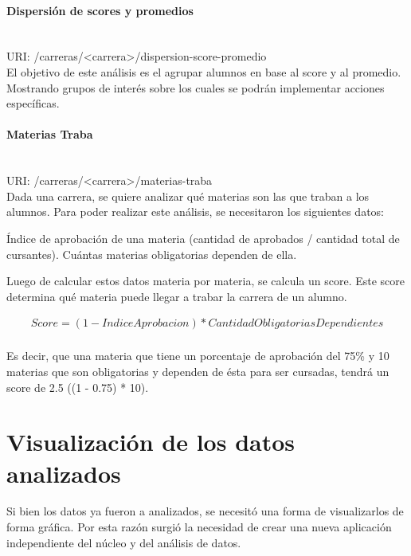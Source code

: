 \paragraph{Dispersión de scores y promedios}\mbox{}\\
URI: /carreras/<carrera>/dispersion-score-promedio \\

El objetivo de este análisis es el agrupar alumnos en base al score y al promedio. Mostrando grupos de interés sobre los cuales se podrán implementar acciones específicas.

\paragraph{Materias Traba}\mbox{}\\

URI: /carreras/<carrera>/materias-traba \\

Dada una carrera, se quiere analizar qué materias son las que traban a los alumnos. 
Para poder realizar este análisis, se necesitaron los siguientes datos:
\begin{outline}
\1 Índice de aprobación de una materia (cantidad de aprobados / cantidad total de cursantes).
\1 Cuántas materias obligatorias dependen de ella.
\end{outline}

Luego de calcular estos datos materia por materia, se calcula un score. Este score determina qué materia puede llegar a trabar la carrera de un alumno.

\begin{align*}
  Score = (1 - IndiceAprobacion) * CantidadObligatoriasDependientes\\
\end{align*}

Es decir, que una materia que tiene un porcentaje de aprobación del 75\% y 10 materias que son obligatorias y dependen de ésta para ser cursadas, tendrá un score de 2.5 ((1 - 0.75) * 10).



\section[Visualización de los datos analizados]{Visualización de los datos analizados}

Si bien los datos ya fueron a analizados, se necesitó una forma de visualizarlos de forma gráfica. Por esta razón surgió la necesidad de crear una nueva aplicación independiente del núcleo y del análisis de datos.

